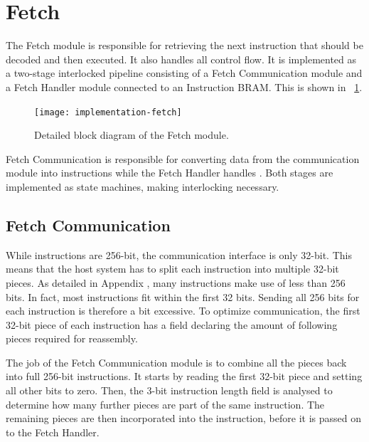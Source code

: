 
\section{Fetch}

The Fetch module is responsible for retrieving the next instruction that should be decoded and then executed.
It also handles all control flow.
It is implemented as a two-stage interlocked pipeline consisting of a Fetch Communication module and a Fetch Handler module connected to an Instruction BRAM.
This is shown in \figurename~\ref{fig:implementation-fetch}.

\begin{figure}[!ht]
    \centering
    \texttt{[image: implementation-fetch]}
    \caption[Fetch module]{Detailed block diagram of the Fetch module.}
    \label{fig:implementation-fetch}
\end{figure}

Fetch Communication is responsible for converting data from the communication module into instructions while the Fetch Handler handles .
Both stages are implemented as state machines, making interlocking necessary.

\subsection{Fetch Communication}

While instructions are 256-bit, the communication interface is only 32-bit.
This means that the host system has to split each instruction into multiple 32-bit pieces.
As detailed in Appendix , many instructions make use of less than 256 bits.
In fact, most instructions fit within the first 32 bits.
Sending all 256 bits for each instruction is therefore a bit excessive.
To optimize communication, the first 32-bit piece of each instruction has a field declaring the amount of following pieces required for reassembly.

The job of the Fetch Communication module is to combine all the pieces back into full 256-bit instructions.
It starts by reading the first 32-bit piece and setting all other bits to zero.
Then, the 3-bit instruction length field is analysed to determine how many further pieces are part of the same instruction.
The remaining pieces are then incorporated into the instruction, before it is passed on to the Fetch Handler.

